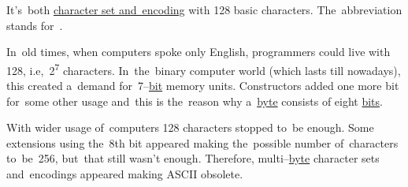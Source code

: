 \label{ascii}
It's~both \hyperref[charactersetencoding]{character set and~encoding} with 128 basic characters.
The~abbreviation stands for~.

In~old times, when computers spoke only English, programmers could live with 128, i.e,~2\textsuperscript{7} characters.
In~the~binary computer world (which lasts till nowadays), this created a~demand for~7--\hyperref[bitsbytes]{bit} memory units.
Constructors added one more bit for~some other usage and~this is the~reason why a~\hyperref[bitsbytes]{byte} consists of eight \hyperref[bitsbytes]{bits}.

With wider usage of~computers 128 characters stopped to~be enough.
Some extensions using the~8th bit appeared making the~possible number of~characters to~be~256, but~that still wasn't enough.
Therefore, multi--\hyperref[bitsbytes]{byte} character sets and~encodings appeared making ASCII obsolete.
